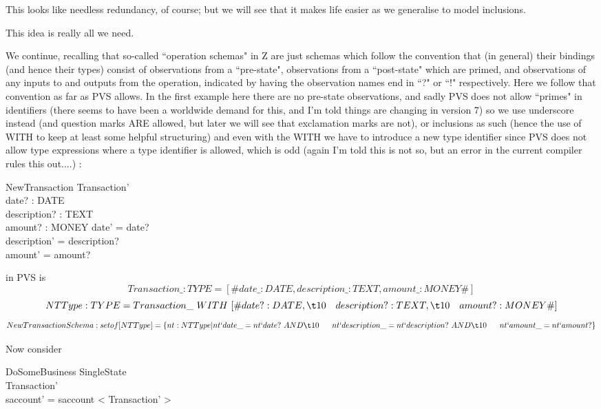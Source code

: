 \documentclass[11pt]{amsart}
\begin{document}
This looks like needless redundancy, of course; but we will see that it makes life easier as we generalise to model inclusions.


This idea is really all we need. 

We continue, recalling that so-called ``operation schemas" in Z are just schemas which follow the convention that (in general) their bindings (and hence their types) consist of observations from a ``pre-state", observations from a ``post-state" which are primed, and observations of any inputs to and outputs from the operation, indicated by having the observation names end in ``?" or ``!" respectively. Here we follow that convention as far as PVS allows. In the first example here there are no pre-state observations, and sadly PVS does not allow ``primes" in identifiers (there seems to have been a worldwide demand for this, and I'm told things are changing in version 7) so we use underscore instead (and question marks ARE allowed, but later we will see that exclamation marks are not), or inclusions as such (hence the use of WITH to keep at least some helpful structuring) and even with the WITH we have to introduce a new type identifier since PVS does not allow type expressions where a type identifier is allowed, which is odd (again I'm told this is not so, but an error in the current compiler rules this out....) :
\begin{schema}{NewTransaction}
Transaction'\\
date? : DATE\\
description? : TEXT\\
amount? : MONEY
\where
date' = date?\\
description' = description?\\
amount' = amount?
\end{schema}
in PVS is
\[
Transaction\_ : TYPE = [\# date\_ : DATE, description\_ : TEXT, amount\_ : MONEY \#]
\]
\[
NTType : TYPE = Transaction\_\ WITH\ [\# date? : DATE, \\
\t10 \ \ \  description? : TEXT, \\
\t10\ \  \ amount? : MONEY \#]
\]
\[
NewTransactionSchema : setof[NTType] = \{nt : NTType | nt`date\_ = nt`date?\ AND\\
 \t10       \ \ \   \     \                                 nt`description\_ = nt`description?\ AND\\
\t10		\ \ \ 	\	\	      nt`amount\_ = nt`amount? \}
\]

Now consider
\begin{schema}{\Phi DoSomeBusiness}
\Delta SingleState\\
Transaction'\\
\where
saccount' = saccount \cat < \theta Transaction' >
\end{schema}
\end{document}
